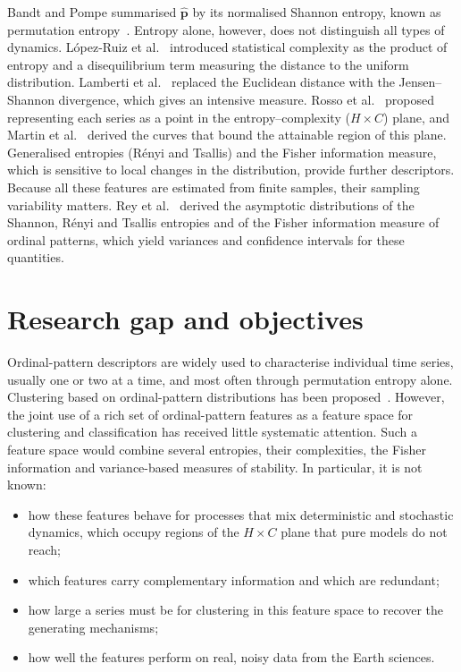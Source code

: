 Bandt and Pompe summarised $\hat{\bm p}$ by its normalised Shannon entropy, known as permutation entropy~\cite{PhysRevLett.88.174102}.
Entropy alone, however, does not distinguish all types of dynamics.
L\'opez-Ruiz et al.~\cite{lopez1995statistical} introduced statistical complexity as the product of entropy and a disequilibrium term measuring the distance to the uniform distribution.
Lamberti et al.~\cite{lamberti2004intensive} replaced the Euclidean distance with the Jensen--Shannon divergence, which gives an intensive measure.
Rosso et al.~\cite{Rosso2007} proposed representing each series as a point in the entropy--complexity ($H\times C$) plane, and Martin et al.~\cite{Martin2006} derived the curves that bound the attainable region of this plane.
Generalised entropies (R\'enyi and Tsallis) and the Fisher information measure, which is sensitive to local changes in the distribution, provide further descriptors.
Because all these features are estimated from finite samples, their sampling variability matters.
Rey et al.~\cite{Rey2024} derived the asymptotic distributions of the Shannon, R\'enyi and Tsallis entropies and of the Fisher information measure of ordinal patterns, which yield variances and confidence intervals for these quantities.

\section{Research gap and objectives}\label{S:intro:gap}

Ordinal-pattern descriptors are widely used to characterise individual time series, usually one or two at a time, and most often through permutation entropy alone.
Clustering based on ordinal-pattern distributions has been proposed~\cite{Brandmaier2015}.
However, the joint use of a rich set of ordinal-pattern features as a feature space for clustering and classification has received little systematic attention.
Such a feature space would combine several entropies, their complexities, the Fisher information and variance-based measures of stability.
In particular, it is not known:
\begin{itemize}
	\item how these features behave for processes that mix deterministic and stochastic dynamics, which occupy regions of the $H\times C$ plane that pure models do not reach;
	\item which features carry complementary information and which are redundant;
	\item how large a series must be for clustering in this feature space to recover the generating mechanisms;
	\item how well the features perform on real, noisy data from the Earth sciences.
\end{itemize}

